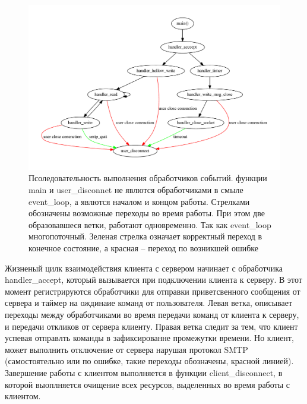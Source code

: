 \documentclass[a4paper,12pt]{report}
\begin{document}
	 	\begin{figure}[H]
		\centering
		\includegraphics[width=\textwidth]{./resource/handlers.pdf}
		\caption{Псоледовательность выполнения обработчиков событий. функции main и user\_disconnet не явлются обработчиками в смыле event\_loop, а явлются началом и концом работы.  Стрелками обозначены возможные переходы во время работы. При этом две образовавшеся ветки, работают одновременно. Так как event\_loop многопоточный. Зеленая стрелка означает корректный переход в конечное состояние, а красная -- переход по возникшей ошибке} \label{fig:ProgLogic}
	\end{figure}
	Жизненый цилк взаимодействия клиента с сервером начинает с обработчика handler\_accept, который вызывается при подключении клиента к серверу. В этот момент регистрируются обработчики для отправки приветсвенного сообщения от сервера и таймер на ождинаие команд от пользователя. Левая ветка, описывает переходы между обработчиками во время передачи команд от клиента к серверу, и передачи откликов от сервера клиенту. Правая ветка следит за тем, что клиент успевая отправлть команды в зафиксированне промежутки времени. Но клиент, может выполнить отключение от сервера нарушая протокол SMTP (самостоятельно или по ошибке, такие переходы обозначены, красной линией). Завершение работы с клиентом выполняется в функции client\_disconnect, в которой выоплняется очищение всех ресурсов, выделенных во время работы с клиентом.
\end{document}
